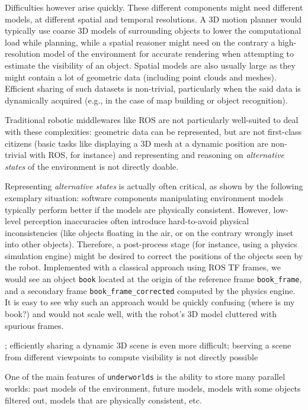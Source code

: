 \documentclass[letterpaper, 10 pt, conference]{ieeeconf}  %
\newcommand{\eg}{e.g.,\xspace}
\newcommand{\uwds}{{\tt underworlds}\xspace}
\begin{document}
Difficulties however arise quickly. These different components might need
different models, at different spatial and temporal resolutions. A 3D motion
planner would typically use coarse 3D models of surrounding objects to lower the
computational load while planning, while a spatial reasoner might need on the
contrary a high-resolution model of the environment for accurate rendering when
attempting to estimate the visibility of an object. Spatial models are also
usually large as they might contain a lot of geometric data (including point
clouds and meshes). Efficient sharing of such datasets is non-trivial,
particularly when the said data is dynamically acquired (\eg in the case of
map building or object recognition).

Traditional robotic middlewares like ROS are not particularly well-suited to
deal with these complexities: geometric data can be represented, but are not
first-class citizens (basic tasks like displaying a 3D mesh at a dynamic
position are non-trivial with ROS, for instance) and representing and reasoning
on \emph{alternative states} of the environment is not directly doable.

Representing \emph{alternative states} is actually often critical, as shown by
the following exemplary situation: software components manipulating environment
models typically perform better if the models are physically consistent.
However, low-level perception inaccuracies often introduce hard-to-avoid
physical inconsistencies (like objects floating in the air, or on the contrary
wrongly inset into other objects). Therefore, a post-process stage (for
instance, using a physics simulation engine) might be desired to correct the
positions of the objects seen by the robot. Implemented with a classical approach using ROS TF
frames, we would see an object {\tt book} located at the origin of the reference
frame {\tt book\_frame}, and a secondary frame {\tt book\_frame\_corrected} computed by the
physics engine. It is easy to see why such an approach would be quickly
confusing (where is my book?) and would not scale well, with the robot's 3D
model cluttered with spurious frames.



; efficiently sharing a dynamic 3D scene is
even more difficult;  bserving a scene from
different viewpoints to compute visibility is not directly possible

One of the main features of \uwds is the ability to store many parallel
worlds: past models of the environment, future models, models with some objects
filtered out, models that are physically consistent, etc.
\end{document}
